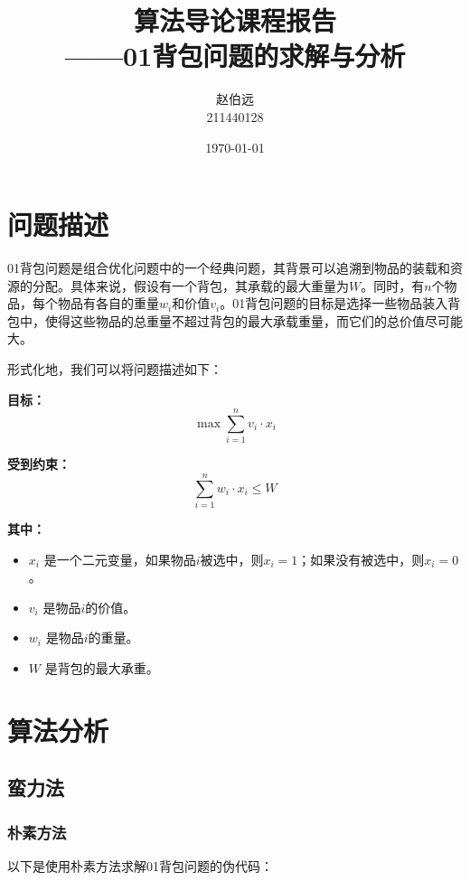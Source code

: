\documentclass[UTF8,titlepage]{ctexart}
\numberwithin{figure}{section}
\begin{document}
\title{算法导论课程报告 \\ \large{——01背包问题的求解与分析}}
\author{赵伯远 \\ 211440128}
\date{\today}
\maketitle

\tableofcontents


\clearpage

\section{问题描述}

01背包问题是组合优化问题中的一个经典问题，其背景可以追溯到物品的装载和资源的分配。具体来说，假设有一个背包，其承载的最大重量为\( W \)。同时，有\( n \)个物品，每个物品有各自的重量\( w_i \)和价值\( v_i \)。01背包问题的目标是选择一些物品装入背包中，使得这些物品的总重量不超过背包的最大承载重量，而它们的总价值尽可能大。

形式化地，我们可以将问题描述如下：

\textbf{目标：}
\begin{equation}
    \max \sum_{i=1}^{n} v_i \cdot x_i
\end{equation}

\textbf{受到约束：}
\begin{equation}
    \sum_{i=1}^{n} w_i \cdot x_i \leq W
\end{equation}

\textbf{其中：}
\begin{itemize}
    \item \( x_i \) 是一个二元变量，如果物品\( i \)被选中，则\( x_i = 1 \)；如果没有被选中，则\( x_i = 0 \)。
    \item \( v_i \) 是物品\( i \)的价值。
    \item \( w_i \) 是物品\( i \)的重量。
    \item \( W \) 是背包的最大承重。
\end{itemize}

\section{算法分析}

\subsection{蛮力法}

\subsubsection{朴素方法}
以下是使用朴素方法求解01背包问题的伪代码：
\end{document}
